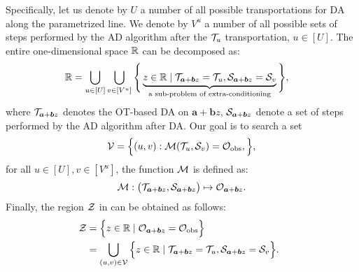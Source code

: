 Specifically, let us denote by $U$ a number of all possible transportations for DA along the parametrized line.
%
%
We denote by $V^u$ a number of all possible sets of steps performed by the AD algorithm after the ${\mathcal T}_u$ transportation, $u \in [U]$.
%
The entire one-dimensional space $\mathbb{R}$ can be decomposed as: 
\begin{align*}
	\mathbb{R}
	& = 
	\bigcup \limits_{u \in [U]}
	\bigcup \limits_{v \in [V^u]}
	\Bigg \{ 
	\underbrace{
	z \in \mathbb{R} 
	\mid 
	{\mathcal T}_{\bm a + \bm b z} = {\mathcal T}_u,
	{\mathcal S}_{\bm a + \bm b z} = {\mathcal S}_v}_{\text{a sub-problem of extra-conditioning}}
	\Bigg \},
\end{align*}
%
where ${\mathcal T}_{\bm a + \bm b z}$ denotes the OT-based DA on $\bm a + \bm b z$, ${\mathcal S}_{\bm a + \bm b z}$ denote a set of steps performed by the AD algorithm after DA.
%
Our goal is to search a set 
%
\begin{align}\label{eq:cW}
	{\mathcal V} = 
	\Big \{ 
		(u, v) : {\mathcal M}({\mathcal T}_u, {\mathcal S}_v) = {\mathcal O}_{\rm obs},
	\Big \}, 
\end{align}
%
for all $u \in [U], v \in [V^u]$, the function ${\mathcal M}$ is defined as:
\[
{\mathcal M} : \big ({\mathcal T}_{\bm a + \bm b z}, {\mathcal S}_{\bm a + \bm b z} \big ) \mapsto {\mathcal O}_{\bm a + \bm b z}.
\]
%
Finally, the region ${\mathcal Z}$ in  can be obtained as follows:
%
\begin{align}
	\hspace{-2mm}\cZ 
	& = \Big \{ 
	z \in \RR 
	\mid 
	\cO_{\bm a + \bm b z} = \cO_{\rm obs}
	\Big \} \nonumber \\ 
	& = 
	\bigcup \limits_{(u, v) \in \cW}
	\Big \{ 
	z \in \RR 
	\mid 
	\cT_{\bm a + \bm b z} = \cT_u,
	\cS_{\bm a + \bm b z} = \cS_v
	\Big \}. \label{eq:cZ_new}
\end{align}
%
%


